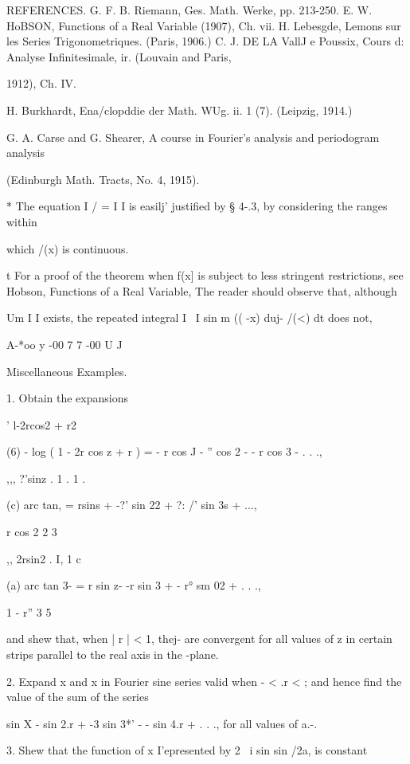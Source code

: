 REFERENCES. G. F. B. Riemann, Ges. Math. Werke, pp. 213-250. E. W.
HoBSON, Functions of a Real Variable (1907), Ch. vii. H. Lebesgde,
Lemons sur les Series Trigonometriques. (Paris, 1906.) C. J. DE LA
VallJ e Poussix, Cours d: Analyse Infinitesimale, ir. (Louvain and
Paris,

1912), Ch. IV.

H. Burkhardt, Ena/clopddie der Math. WUg. ii. 1 (7). (Leipzig, 1914.)

G. A. Carse and G. Shearer, A course in Fourier's analysis and
periodogram analysis

(Edinburgh Math. Tracts, No. 4, 1915).

* The equation I / = I I is easilj' justified by § 4-.3, by
considering the ranges within

which /(x) is continuous.

t For a proof of the theorem when f(x] is subject to less stringent
restrictions, see Hobson, Functions of a Real Variable, %
The reader should observe that, although

Um I I exists, the repeated integral I \ I sin m (( -x) duj- /(<) dt
does not,

A-*oo y -00 7 7 -00 U J

%
%

Miscellaneous Examples.

1. Obtain the expansions

  ' l-2rcos2 + r2

(6) - log ( 1 - 2r cos z + r ) = - r cos J - '' cos 2 - - r cos 3 - .
. .,

,,, ?'sinz . 1 . 1 . \,

(c) arc tan, = rsins + -?' sin 22 + ?: /' sin 3s + ...,

   r cos 2 2 3

,, 2rsin2 . I,  1 c

(a) arc tan 3- = r sin z- -r sin 3 + - r° sm 02 + . . .,

1 - r'' 3 5

and shew that, when | r | < 1, thej- are convergent for all values of
z in certain strips parallel to the real axis in the -plane.

2. Expand x and x in Fourier sine series valid when - \pi < .r < \pi;
and hence find the value of the sum of the series

sin X - sin 2.r + -3 sin 3*' - - sin 4.r + . . ., for all values of
a.-. 

3. Shew that the function of x I'epresented by 2 ~i sin sin /2a, is
constant

